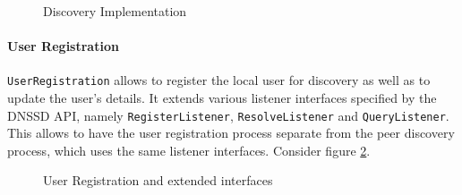 \begin{figure}[H]
 \centering
 \caption{Discovery Implementation}
 \label{fig:network.discovery.implementation}
\end{figure}

\paragraph{User Registration}
 \texttt{UserRegistration} allows to register the local user for discovery as well as to update the user's details. It extends 
 various listener interfaces specified by the DNSSD API, namely  \texttt{RegisterListener},  \texttt{ResolveListener} and  \texttt{QueryListener}. This allows to have the user registration process separate from the peer discovery process, which uses the same listener interfaces. Consider figure \ref{fig:network.discovery.userregistration}.

\begin{figure}[H]
 \centering
 \caption{User Registration and extended interfaces}
 \label{fig:network.discovery.userregistration}
\end{figure}


